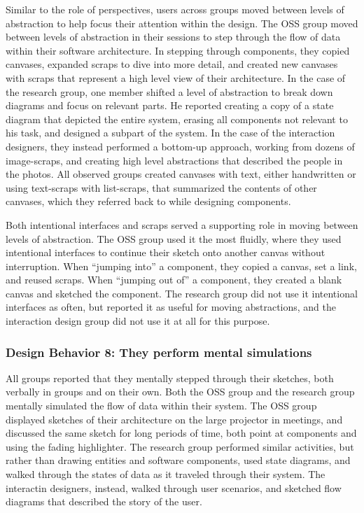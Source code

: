 Similar to the role of perspectives, users across groups moved between levels of abstraction to help focus their attention within the design. The OSS group moved between levels of abstraction in their sessions to step through the flow of data within their software architecture. In stepping through components, they copied canvases, expanded scraps to dive into more detail, and created new canvases with scraps that represent a high level view of their architecture. In the case of the research group, one member shifted a level of abstraction to break down diagrams and focus on relevant parts. He reported creating a copy of a state diagram that depicted the entire system, erasing all components not relevant to his task, and designed a subpart of the system. In the case of the interaction designers, they instead performed a bottom-up approach, working from dozens of image-scraps, and creating high level abstractions that described the people in the photos. All observed groups created canvases with text, either handwritten or using text-scraps with list-scraps, that summarized the contents of other canvases, which they referred back to while designing components. 

Both intentional interfaces and scraps served a supporting role in moving between levels of abstraction. The OSS group used it the most fluidly, where they used intentional interfaces to continue their sketch onto another canvas without interruption. When ``jumping into'' a component, they copied a canvas, set a link, and reused scraps. When ``jumping out of'' a component, they created a blank canvas and sketched the component. The research group did not use it intentional interfaces as often, but reported it as useful for moving abstractions, and the interaction design group did not use it at all for this purpose.



\subsubsection{Design Behavior 8: They perform mental simulations}

All groups reported that they mentally stepped through their sketches, both verbally in groups and on their own. Both the OSS group and the research group mentally simulated the flow of data within their system. The OSS group displayed sketches of their architecture on the large projector in meetings, and discussed the same sketch for long periods of time, both point at components and using the fading highlighter. The research group performed similar activities, but rather than drawing entities and software components, used state diagrams, and walked through the states of data as it traveled through their system. The interactin designers, instead, walked through user scenarios, and sketched flow diagrams that described the story of the user.

